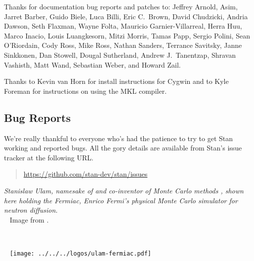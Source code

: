 Thanks for documentation bug reports and patches to: 
Jeffrey Arnold,
Asim, 
Jarret Barber, 
Guido Biele,
Luca Billi, 
Eric C.~Brown, 
David Chudzicki,
Andria Dawson, 
Seth Flaxman, 
Wayne Folta, 
Mauricio Garnier-Villarreal,
Herra Huu,
Marco Inacio, 
Louis Luangkesorn, 
Mitzi Morris,
Tamas Papp, 
Sergio Polini,
Sean O'Riordain, 
Cody Ross, 
Mike Ross, 
Nathan Sanders, 
Terrance Savitsky,
Janne Sinkkonen, 
Dan Stowell, 
Dougal Sutherland, 
Andrew J.~Tanentzap,
Shravan Vashisth, 
Matt Wand,
Sebastian Weber, and
Howard Zail.

Thanks to Kevin van Horn for install instructions for Cygwin and to
Kyle Foreman for instructions on using the MKL compiler.


\subsection*{Bug Reports}

We're really thankful to everyone who's had the patience to try
to get Stan working and reported bugs.  All the gory details are
available from Stan's issue tracker at the following URL.
%
\begin{quote}
\url{https://github.com/stan-dev/stan/issues}
\end{quote}




\vfill
\begin{center}
\hfill
\begin{minipage}[b]{2in}
  \footnotesize {\it Stanislaw Ulam, namesake of \Stan and co-inventor
    of Monte Carlo methods \citep{MetropolisUlam:1949}, shown here
    holding the Fermiac, Enrico Fermi's physical Monte Carlo simulator
    for neutron diffusion.}
  \\[3pt] \mbox{ } \hfill
  {\scriptsize Image from \citep{Giesler:2000}.}
\end{minipage} \ \ \ \ \ 
\begin{minipage}[b]{1.5in} \mbox{ } \hfill
  \texttt{[image: ../../../logos/ulam-fermiac.pdf]}
\end{minipage} 
\end{center}
